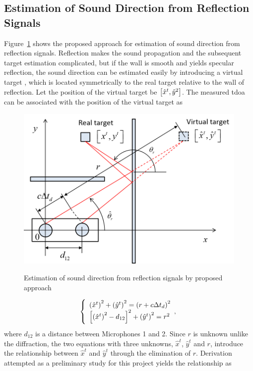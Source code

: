 \documentclass[letterpaper, 10 pt, conference]{ieeeconf}  %
\begin{document}
\subsection{Estimation of Sound Direction from Reflection Signals} Figure~\ref{fig:reflection} shows the proposed approach for estimation of sound direction from reflection signals.  Reflection makes the sound propagation and the subsequent target estimation complicated, but if the wall is smooth and yields specular reflection, the sound direction can be estimated easily by introducing a virtual target \cite{pulkki1997}, which is located symmetrically to the real target relative to the wall of reflection.  Let the position of the virtual target be $\left [ \hat x^t, \hat y^2 \right ]$.  The measured \gls{tdoa} can be associated with the position of the virtual target as\\
\begin{figure}[h]
	{\centering
		\includegraphics[width=0.7\columnwidth]{Figures/reflection.png}
	}
	\caption{\footnotesize {Estimation of sound direction from reflection signals by proposed approach} }
	\label{fig:reflection}
\end{figure}
\begin{multline}\label{eq:reflection}
\left\{
\begin{array}{ll}
\left ( \hat x^t \right )^2 + \left ( \hat y^t \right )^2 = \left ( r + c \Delta t_d \right )^2\\
\left [ \left ( \hat x^t \right )^2 - d_{12} \right ]^2 + \left ( \hat y^t \right )^2 = r^2
\end{array},
\right.
\end{multline}
where $d_{12}$ is a distance between Microphones 1 and 2.  Since $r$ is unknown unlike the diffraction, the two equations with three unknowns, $\hat x^t$, $\hat y^t$ and $r$, introduce the relationship between $\hat x^t$ and $\hat y^t$ through the elimination of $r$.  Derivation attempted as a preliminary study for this project yields the relationship as
\end{document}
